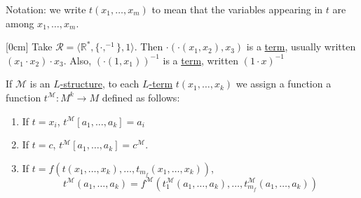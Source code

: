 \documentclass{article}
\begin{document}
Notation: we write $t(x_1, \dotsc, x_m)$ to mean that the variables appearing in $t$ are among $x_1, \dotsc, x_m$.
\begin{eg}
  [0cm]
  Take $\mathcal{R} = \langle \mathbb{R}^*, \{\cdot, ^{-1}\}, 1 \rangle$.
  Then $\cdot ( \cdot(x_1, x_2), x_3)$ is a \hyperlink{def:lterm}{term}, usually written $(x_1 \cdot x_2) \cdot x_3$.
  Also, $(\cdot (1, x_1))^{-1}$ is a \hyperlink{def:lterm}{term}, written $(1\cdot x)^{-1}$
\end{eg}
\begin{ndef}\label{def:2.2}
  If $\mathcal{M}$ is an \hyperlink{def:lstr}{$L$-structure}, to each \hyperlink{def:lterm}{$L$-term} $t(x_1, \dotsc, x_k)$ we assign a function
  a function $t^\mathcal{M}: M^k \to M$ defined as follows:
  \begin{enumerate}[label=(\roman*)]
    \item If $t = x_i$, $t^\mathcal{M}[a_1, \dotsc, a_k] = a_i$
    \item If $t = c$, $t^\mathcal{M}[a_1, \dotsc, a_k] = c^\mathcal{M}$.
    \item If $t = f(t(x_1, \dotsc, x_k), \dotsc, t_{m_f}(x_1, \dotsc, x_k))$,
      \begin{equation*}
        t^\mathcal{M}(a_1, \dotsc, a_k) = f^\mathcal{M}(t_1^\mathcal{M}(a_1, \dotsc, a_k), \dotsc, t^\mathcal{M}_{m_f}(a_1, \dotsc, a_k))
      \end{equation*}
  \end{enumerate}
\end{ndef}
\end{document}
